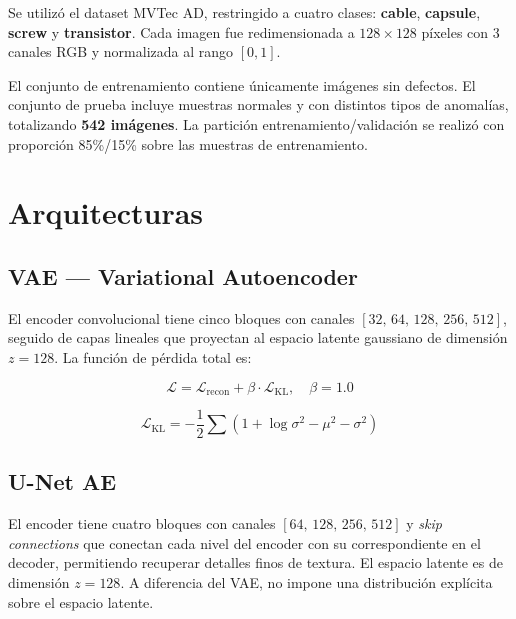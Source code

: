 \documentclass[conference]{IEEEtran}
\begin{document}
Se utiliz\'o el dataset MVTec AD, restringido a cuatro clases:
\textbf{cable}, \textbf{capsule}, \textbf{screw} y \textbf{transistor}.
Cada imagen fue redimensionada a $128 \times 128$ p\'ixeles con 3 canales
RGB y normalizada al rango $[0,1]$.

El conjunto de entrenamiento contiene \'unicamente im\'agenes sin defectos.
El conjunto de prueba incluye muestras normales y con distintos tipos de
anomal\'ias, totalizando \textbf{542 im\'agenes}.
La partici\'on entrenamiento/validaci\'on se realiz\'o con proporci\'on
85\%/15\% sobre las muestras de entrenamiento.

\section{Arquitecturas}

\subsection{VAE --- Variational Autoencoder}

El encoder convolucional tiene cinco bloques con canales
$[32,\,64,\,128,\,256,\,512]$, seguido de capas lineales que proyectan
al espacio latente gaussiano de dimensi\'on $z = 128$.
La funci\'on de p\'erdida total es:

\begin{equation}
  \mathcal{L} = \mathcal{L}_{\text{recon}}
              + \beta \cdot \mathcal{L}_{\text{KL}}, \quad \beta = 1.0
\end{equation}

\begin{equation}
  \mathcal{L}_{\text{KL}}
    = -\frac{1}{2}\sum\!\left(1 + \log\sigma^2 - \mu^2 - \sigma^2\right)
\end{equation}

\subsection{U-Net AE}

El encoder tiene cuatro bloques con canales $[64,\,128,\,256,\,512]$ y
\textit{skip connections} que conectan cada nivel del encoder con su
correspondiente en el decoder, permitiendo recuperar detalles finos de
textura.
El espacio latente es de dimensi\'on $z = 128$.
A diferencia del VAE, no impone una distribuci\'on expl\'icita sobre el
espacio latente.

\end{document}
